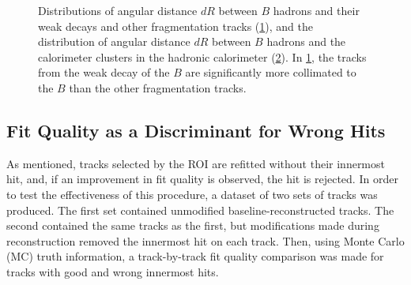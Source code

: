 %
\begin{figure}[!htbp]
    \centering
    \begin{subfigure}{.4\textwidth}
      \centering
      \caption{}
      \label{fig:B dR match sub1}
    \end{subfigure}%
    \begin{subfigure}{.4\textwidth}
      \centering
      \caption{}
      \label{fig:B dR match sub2}
    \end{subfigure}
    \caption{Distributions of angular distance $dR$ between $B$ hadrons and their weak decays and other fragmentation tracks (\cref{fig:B dR match sub1}), and the distribution of angular distance $dR$ between $B$ hadrons and the calorimeter clusters in the hadronic calorimeter (\cref{fig:B dR match sub2}). In \cref{fig:B dR match sub1}, the tracks from the weak decay of the $B$ are significantly more collimated to the $B$ than the other fragmentation tracks.}
    \label{fig:B dR match}
\end{figure}
%

\subsection{Fit Quality as a Discriminant for Wrong Hits}
As mentioned, tracks selected by the ROI are refitted without their innermost hit, and, if an improvement in fit quality is observed, the hit is rejected. In order to test the effectiveness of this procedure, a dataset of two sets of tracks was produced. The first set contained unmodified baseline-reconstructed tracks. The second contained the same tracks as the first, but modifications made during reconstruction removed the innermost hit on each track. Then, using Monte Carlo (MC) truth information, a track-by-track fit quality comparison was made for tracks with good and wrong innermost hits. 

